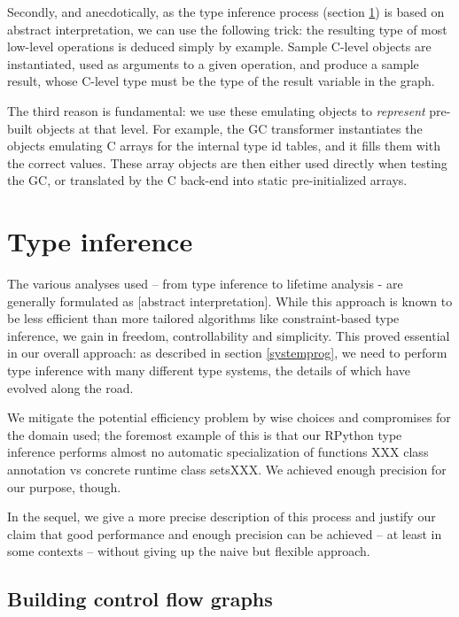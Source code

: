 \documentclass{acm_proc_article-sp}
\begin{document}
Secondly, and anecdotically, as the type inference process (section
\ref{typeinference}) is based on abstract interpretation, we can use
the following trick: the resulting type of most low-level operations
is deduced simply by example.  Sample C-level objects are
instantiated, used as arguments to a given operation, and produce a
sample result, whose C-level type must be the type of the result
variable in the graph.

The third reason is fundamental: we use these emulating objects to
\textit{represent} pre-built objects at that level.  For example, the GC
transformer instantiates the objects emulating C arrays for the internal
type id tables, and it fills them with the correct values.  These array
objects are then either used directly when testing the GC, or translated
by the C back-end into static pre-initialized arrays.



\section{Type inference}
\label{typeinference}


The various analyses used -- from type inference to lifetime analysis -
are generally formulated as [abstract interpretation].  While this
approach is known to be less efficient than more tailored algorithms
like constraint-based type inference, we gain in freedom,
controllability and simplicity.  This proved essential in our overall
approach: as described in section \ref{systemprog}, we need to perform
type inference with many different type systems, the details of which
have evolved along the road.

We mitigate the potential efficiency problem by wise choices and
compromises for the domain used; the foremost example of this is that
our RPython type inference performs almost no automatic specialization
of functions XXX class annotation vs concrete runtime class setsXXX.
We achieved enough precision for our purpose, though.

In the sequel, we give a more precise description of this process and
justify our claim that good performance and enough precision can be
achieved -- at least in some contexts -- without giving up the naive but
flexible approach.


\subsection{Building control flow graphs}
\label{flowobjspace}
\hypertarget{flowobjspace}{}
\end{document}
